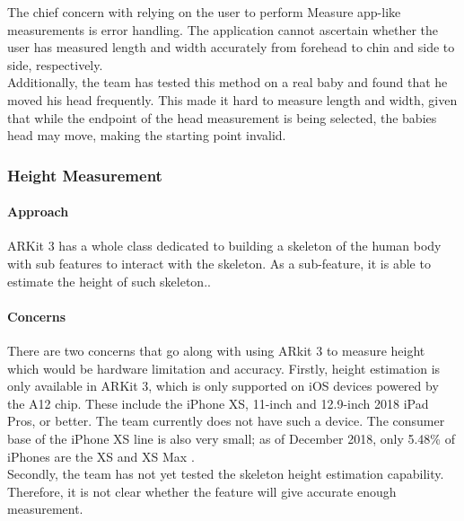 \documentclass[onecolumn, draftclsnofoot,10pt, compsoc]{IEEEtran}
\begin{document}
The chief concern with relying on the user to perform Measure app-like measurements is error handling. The application cannot ascertain whether the user has measured length and width accurately from forehead to chin and side to side, respectively.\\

Additionally, the team has tested this method on a real baby and found that he moved his head frequently. This made it hard to measure length and width, given that while the endpoint of the head measurement is being selected, the babies head may move, making the starting point invalid.\\

\subsubsection{Height Measurement}

\paragraph{Approach}

ARKit 3 has a whole class dedicated to building a skeleton of the human body with sub features to interact with the skeleton. As a sub-feature, it is able to estimate the height of such skeleton.\cite{automaticSkeletonScaleEstimationEnabled}.\\

\paragraph{Concerns}

There are two concerns that go along with using ARkit 3 to measure height which would be hardware limitation and accuracy. Firstly, height estimation is only available in ARKit 3, which is only supported on iOS devices powered by the A12 chip. These include the iPhone XS, 11-inch and 12.9-inch 2018 iPad Pros, or better\cite{ARKit3_support}. The team currently does not have such a device. The consumer base of the iPhone XS line is also very small; as of December 2018, only 5.48\% of iPhones are the XS and XS Max \cite{iPhone_percentage}.\\

Secondly, the team has not yet tested the skeleton height estimation capability. Therefore, it is not clear whether the feature will give accurate enough measurement.\\
\end{document}
